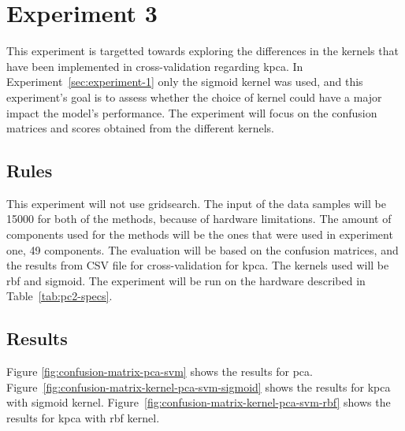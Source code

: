 \section{Experiment 3}\label{sec:experiment-3}
This experiment is targetted towards exploring the differences in the kernels that have been implemented in cross-validation regarding \gls{kpca}. In Experiment~\ref{sec:experiment-1} only the sigmoid kernel was used, and this experiment's goal is to assess whether the choice of kernel could have a major impact the model's performance. The experiment will focus on the confusion matrices and scores obtained from the different kernels. 




\subsection{Rules}
This experiment will not use gridsearch. The input of the data samples will be 15000 for both of the methods, because of hardware limitations. The amount of components used for the methods will be the ones that were used in experiment one, 49 components. The evaluation will be based on the confusion matrices, and the results from CSV file for cross-validation for \gls{kpca}. The kernels used will be \gls{rbf} and sigmoid. The experiment will be run on the hardware described in Table~\ref{tab:pc2-specs}.

\subsection{Results}\label{subsec:experiment-3-results}
Figure \ref{fig:confusion-matrix-pca-svm} shows the results for \gls{pca}.
Figure~\ref{fig:confusion-matrix-kernel-pca-svm-sigmoid} shows the results for \gls{kpca} with sigmoid kernel.
Figure~\ref{fig:confusion-matrix-kernel-pca-svm-rbf} shows the results for \gls{kpca} with rbf kernel.


